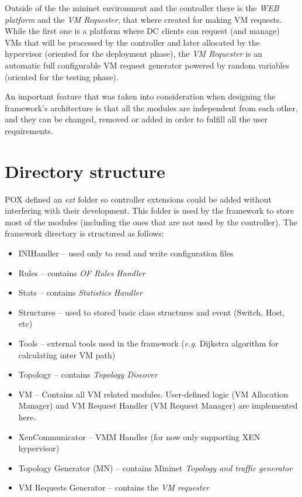 \documentclass[12pt,english,oneside]{book}
\begin{document}
Outside of the the mininet environment and the controller there is the {\it WEB platform} and the {\it VM Requester}, that where created for making VM requests. While the first one is a platform where DC clients can request (and manage) VMs that will be processed by the controller and later allocated by the hypervisor (oriented for the deployment phase), the {\it VM Requester} is an automatic full configurable VM request generator powered by random variables (oriented for the testing phase).

An important feature that was taken into consideration when designing the framework's architecture is that all the modules are independent from each other, and they can be changed, removed or added in order to fulfill all the user requirements.

\newpage
\section{Directory structure}

POX defined an \textit{ext} folder so controller extensions could be added without interfering with their development. This folder is used by the framework to store most of the modules (including the ones that are not used by the controller).
The framework directory is structured as follows:

\begin{itemize}
  \item INIHandler -- used only to read and write configuration files
  \item Rules -- contains \textit{OF Rules Handler}
  \item Stats -- contains \textit{Statistics Handler}
  \item Structures -- used to stored basic class structures and event (Switch, Host, etc)
  \item Tools -- external tools used in the framework (\textit{e.g.} Dijkstra algorithm for calculating inter VM path)
  \item Topology -- contains \textit{Topology Discover}
  \item VM -- Contains all VM related modules. User-defined logic (VM Allocation Manager) and VM Request Handler (VM Request Manager) are implemented here.
  \item XenCommunicator -- VMM Handler (for now only supporting XEN hypervisor)
  \item Topology Generator (MN) -- contains Mininet \textit{Topology and traffic generator}
  \item VM Requests Generator -- contains the \textit{VM requester}
\end{itemize}
\end{document}
